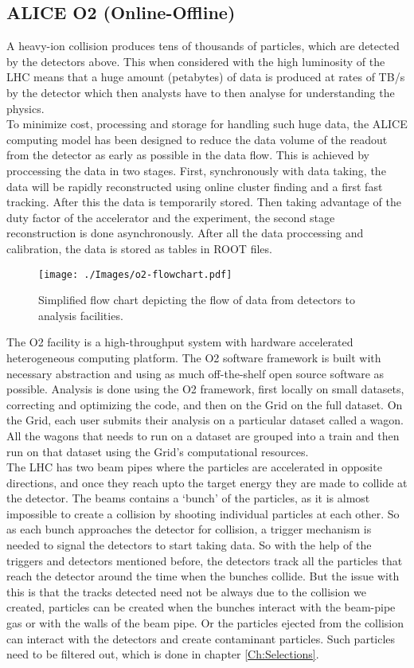 \documentclass[12pt,a4paper,twoside]{report}
\begin{document}
\subsection{ALICE O2 (Online-Offline)}
A heavy-ion collision produces tens of thousands of particles, which are detected by the detectors above. This when considered with the high luminosity of the LHC means that a huge amount (petabytes) of data is produced at rates of TB/s by the detector which then analysts have to then analyse for understanding the physics.\\

To minimize cost, processing and storage for handling such huge data, the ALICE computing model has been designed to reduce the data volume of the readout from the detector as early as possible in the data flow. This is achieved by proccessing the data in two stages. First, synchronously with data taking, the data will be rapidly reconstructed using online cluster finding and a first fast tracking. After this the data is temporarily stored. Then taking advantage of the duty factor of the accelerator and the experiment, the second stage reconstruction is done asynchronously. After all the data proccessing and calibration, the data is stored as tables in ROOT files.\\
\begin{figure}[H]
	\centering
	\texttt{[image: ./Images/o2-flowchart.pdf]}
	\caption{Simplified flow chart depicting the flow of data from detectors to analysis facilities.}
\end{figure}
The O2 facility is a high-throughput system with hardware accelerated heterogeneous computing platform. The O2 software framework is built with necessary abstraction and using as much off-the-shelf open source software as possible. Analysis is done using the O2 framework, first locally on small datasets, correcting and optimizing the code, and then on the Grid on the full dataset. On the Grid, each user submits their analysis on a particular dataset called a wagon. All the wagons that needs to run on a dataset are grouped into a train and then run on that dataset using the Grid's computational resources. \cite{Ref:O2-TDR}\\

The LHC has two beam pipes where the particles are accelerated in opposite directions, and once they reach upto the target energy they are made to collide at the detector. The beams contains a `bunch' of the particles, as it is almost impossible to create a collision by shooting individual particles at each other. So as each bunch approaches the detector for collision, a trigger mechanism is needed to signal the detectors to start taking data. So with the help  of the triggers and detectors mentioned before, the detectors track all the particles that reach the detector around the time when the bunches collide. But the issue with this is that the tracks detected need not be always due to the collision we created, particles can be created when the bunches interact with the beam-pipe gas or with the walls of the beam pipe. Or the particles ejected from the collision can interact with the detectors and create contaminant particles. Such particles need to be filtered out, which is done in chapter \ref{Ch:Selections}.
\end{document}
